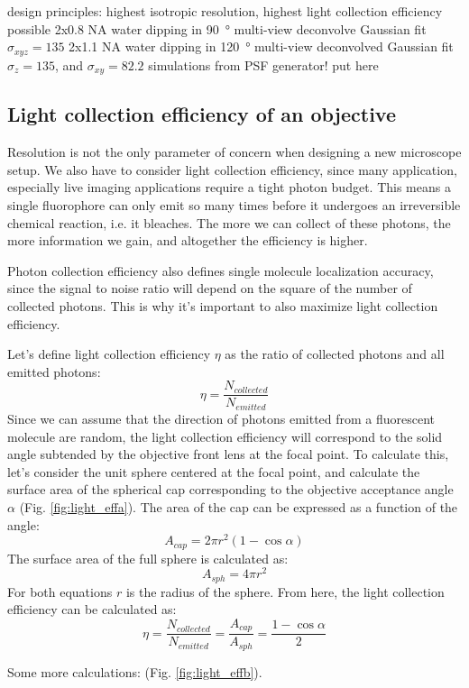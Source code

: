   design principles:
  highest isotropic resolution, highest light collection efficiency possible
  2x0.8 NA water dipping in \SI{90}{\degree} multi-view deconvolve Gaussian fit $\sigma_{xyz}=135$
  2x1.1 NA water dipping in \SI{120}{\degree} multi-view deconvolved Gaussian fit $\sigma_z = 135$, and $\sigma_{xy} = 82.2$
  simulations from PSF generator! put here

  \subsection{Light collection efficiency of an objective}
    Resolution is not the only parameter of concern when designing a new microscope setup. We also have to consider light collection efficiency, since many application, especially live imaging applications require a tight photon budget. This means a single fluorophore can only emit so many times before it undergoes an irreversible chemical reaction, i.e. it bleaches. The more we can collect of these photons, the more information we gain, and altogether the efficiency is higher.

    Photon collection efficiency also defines single molecule localization accuracy, since the signal to noise ratio will depend on the square of the number of collected photons. This is why it's important to also maximize light collection efficiency.

    Let's define light collection efficiency $\eta$ as the ratio of collected photons and all emitted photons:
    \[
    \eta = \frac{N_{collected}}{N_{emitted}}
    \]
    Since we can assume that the direction of photons emitted from a fluorescent molecule are random, the light collection efficiency will correspond to the solid angle subtended by the objective front lens at the focal point. To calculate this, let's consider the unit sphere centered at the focal point, and calculate the surface area of the spherical cap corresponding to the objective acceptance angle $\alpha$ (Fig. \ref{fig:light_effa}). The area of the cap can be expressed as a function of the angle:
    \[
    A_{cap} = 2\pi r^2 (1-\cos \alpha)
    \]
    The surface area of the full sphere is calculated as:
    \[
    A_{sph} = 4 \pi r^2
    \]
    For both equations $r$ is the radius of the sphere. From here, the light collection efficiency can be calculated as:
    \[
    \eta = \frac{N_{collected}}{N_{emitted}} = \frac{A_{cap}}{A_{sph}} = \frac{1-\cos \alpha}{2}
    \]

    Some more calculations: (Fig. \ref{fig:light_effb}).


